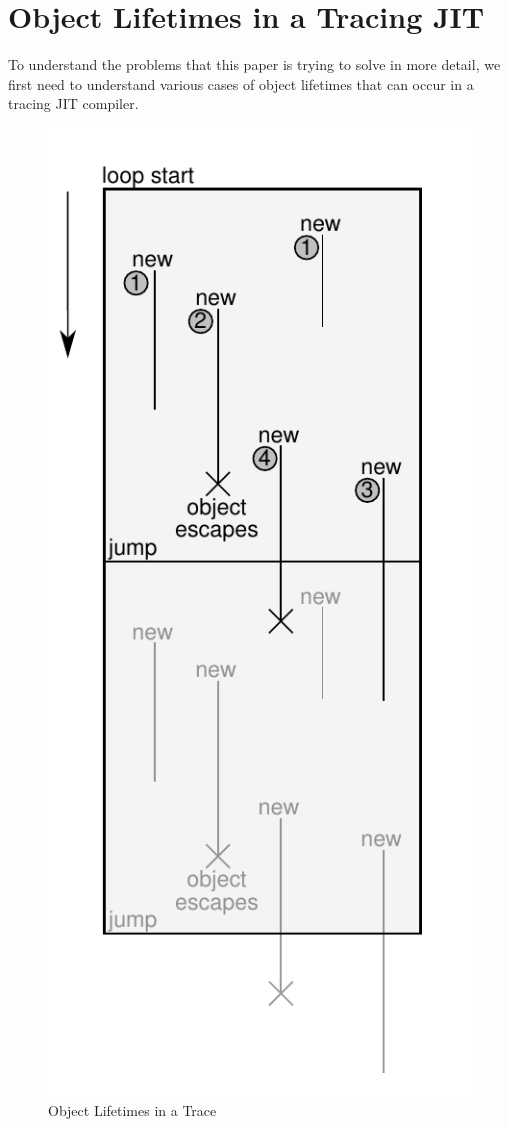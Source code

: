 \documentclass[preprint]{sigplanconf}
\begin{document}
\section{Object Lifetimes in a Tracing JIT}
\label{sec:lifetimes}


To understand the problems that this paper is trying to solve in more detail, we
first need to understand various cases of object lifetimes that can occur in a
tracing JIT compiler.

\begin{figure}
\begin{center}
\includegraphics[scale=0.6]{figures/obj-lifetime.pdf}
\end{center}

\caption{Object Lifetimes in a Trace}
\label{fig:lifetimes}
\end{figure}
\end{document}
